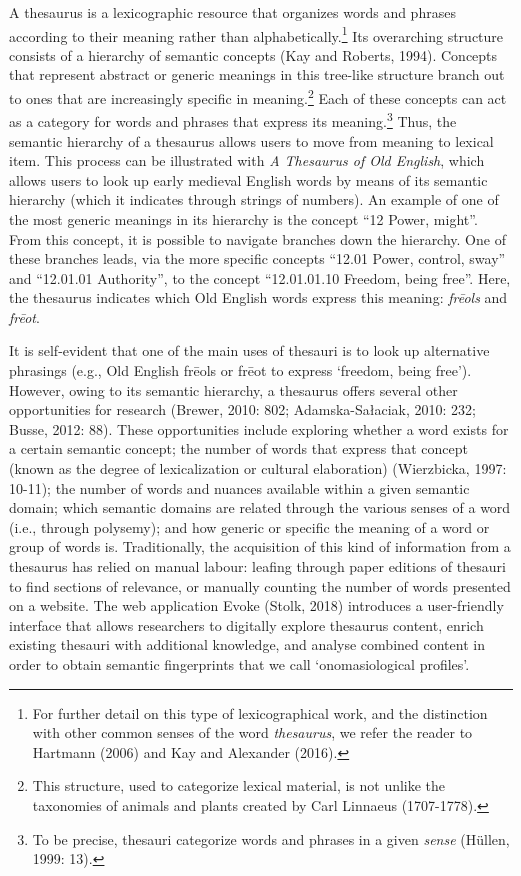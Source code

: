A thesaurus is a lexicographic resource that organizes words and phrases according to their meaning rather than alphabetically.\footnote{For further detail on this type of lexicographical work, and the distinction with other common senses of the word \textit{thesaurus}, we refer the reader to Hartmann (2006) and Kay and Alexander (2016).}  Its overarching structure consists of a hierarchy of semantic concepts (Kay and Roberts, 1994). Concepts that represent abstract or generic meanings in this tree-like structure branch out to ones that are increasingly specific in meaning.\footnote{This structure, used to categorize lexical material, is not unlike the taxonomies of animals and plants created by Carl Linnaeus (1707-1778).}  Each of these concepts can act as a category for words and phrases that express its meaning.\footnote{To be precise, thesauri categorize words and phrases in a given \textit{sense} (Hüllen, 1999: 13).}  Thus, the semantic hierarchy of a thesaurus allows users to move from meaning to lexical item. This process can be illustrated with \textit{A Thesaurus of Old English}, which allows users to look up early medieval English words by means of its semantic hierarchy (which it indicates through strings of numbers). An example of one of the most generic meanings in its hierarchy is the concept “12 Power, might”. From this concept, it is possible to navigate branches down the hierarchy. One of these branches leads, via the more specific concepts “12.01 Power, control, sway” and “12.01.01 Authority”, to the concept “12.01.01.10 Freedom, being free”. Here, the thesaurus indicates which Old English words express this meaning: \textit{frēols} and \textit{frēot}.

It is self-evident that one of the main uses of thesauri is to look up alternative phrasings (e.g., Old English frēols or frēot to express ‘freedom, being free’).  However, owing to its semantic hierarchy, a thesaurus offers several other opportunities for research (Brewer, 2010: 802; Adamska-Sałaciak, 2010: 232; Busse, 2012: 88).  These opportunities include exploring whether a word exists for a certain semantic concept; the number of words that express that concept (known as the degree of lexicalization or cultural elaboration) (Wierzbicka, 1997: 10-11); the number of words and nuances available within a given semantic domain; which semantic domains are related through the various senses of a word (i.e., through polysemy); and how generic or specific the meaning of a word or group of words is. Traditionally, the acquisition of this kind of information from a thesaurus has relied on manual labour: leafing through paper editions of thesauri to find sections of relevance,  or manually counting the number of words presented on a website.  The web application Evoke (Stolk, 2018) introduces a user-friendly interface that allows researchers to digitally explore thesaurus content, enrich existing thesauri with additional knowledge, and analyse combined content in order to obtain semantic fingerprints that we call ‘onomasiological profiles’.

